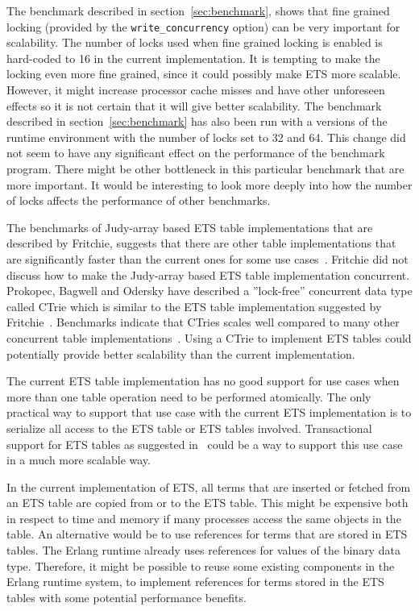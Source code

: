 \documentclass[aps,pre,preprint,nofootinbib]{revtex4}
\begin{document}
  The benchmark described in section~\ref{sec:benchmark}, shows that fine grained locking (provided by the \verb|write_concurrency| option) can be very important for scalability.
  The number of locks used when fine grained locking is enabled is hard-coded to 16 in the current implementation.
  It is tempting to make the locking even more fine grained, since it could possibly make ETS more scalable.
  However, it might increase processor cache misses and have other unforeseen effects so it is not certain that it will give better scalability.
  The benchmark described in section~\ref{sec:benchmark} has also been run with a versions of the runtime environment with the number of locks set to 32 and 64.
  This change did not seem to have any significant effect on the performance of the benchmark program.
  There might be other bottleneck in this particular benchmark that are more important.
  It would be interesting to look more deeply into how the number of locks affects the performance of other benchmarks.

  The benchmarks of Judy-array based ETS table implementations that are described by Fritchie, suggests that there are other table implementations that are significantly faster than the current ones for some use cases~\cite{ScottEtsJudy}.
  Fritchie did not discuss how to make the Judy-array based ETS table implementation concurrent.
  Prokopec, Bagwell and Odersky have described a ''lock-free'' concurrent data type called CTrie which is similar to the ETS table implementation suggested by Fritchie~\cite{ProkopecCTrie}.
  Benchmarks indicate that CTries scales well compared to many other concurrent table implementations~\cite{ProkopecCTrie}.
  Using a CTrie to implement ETS tables could potentially provide better scalability than the current implementation.

  The current ETS table implementation has no good support for use cases when more than one table operation need to be performed atomically.
  The only practical way to support that use case with the current ETS implementation is to serialize all access to the ETS table or ETS tables involved.
  Transactional support for ETS tables as suggested in~\cite{PatrikErlangTrans} could be a way to support this use case in a much more scalable way.

  In the current implementation of ETS, all terms that are inserted or fetched from an ETS table are copied from or to the ETS table.
  This might be expensive both in respect to time and memory if many processes access the same objects in the table.
  An alternative would be to use references for terms that are stored in ETS tables.
  The Erlang runtime already uses references for values of the binary data type.
  Therefore, it might be possible to reuse some existing components in the Erlang runtime system, to implement references for terms stored in the ETS tables with some potential performance benefits.
\end{document}
